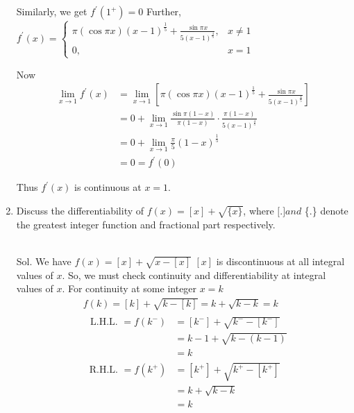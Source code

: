 \begin{enumerate}
\begin{outline}
Similarly, we get $f^{\prime}\left(1^{+}\right)=0$
Further, $f^{\prime}(x)= \begin{cases}\pi(\cos \pi x)(x-1)^{\frac{1}{5}}+\frac{\sin \pi x}{5(x-1)^{\frac{4}{5}}}, & x \neq 1 \\ 0, & x=1\end{cases}$

Now
$$
\begin{aligned}
\lim _{x \rightarrow 1} f^{\prime}(x) & =\lim _{x \rightarrow 1}\left[\pi(\cos \pi x)(x-1)^{\frac{1}{5}}+\frac{\sin \pi x}{5(x-1)^{\frac{4}{5}}}\right] \\
& =0+\lim _{x \rightarrow 1} \frac{\sin \pi(1-x)}{\pi(1-x)} \cdot \frac{\pi(1-x)}{5(x-1)^{\frac{4}{5}}} \\
& =0+\lim _{x \rightarrow 1} \frac{\pi}{5}(1-x)^{\frac{1}{5}} \\
& =0=f^{\prime}(0)
\end{aligned}
$$

Thus $f^{\prime}(x)$ is continuous at $x=1$.
\end{outline}

\item Discuss the differentiability of $f(x)=[x]+\sqrt{\{x\}}$, where $[$.$] and$ \{.\} denote the greatest integer function and fractional part respectively.\\\\

\begin{outline}
    Sol. We have $f(x)=[x]+\sqrt{x-[x]}$
$[x]$ is discontinuous at all integral values of $x$.
So, we must check continuity and differentiability at integral values of $x$.
For continuity at some integer $x=k$
$$
\begin{aligned}
& f(k)=[k]+\sqrt{k-[k]}=k+\sqrt{k-k}=k \\
& \begin{aligned}
\text { L.H.L. }=f\left(k^{-}\right) & =\left[k^{-}\right]+\sqrt{k^{-}-\left[k^{-}\right]} \\
& =k-1+\sqrt{k-(k-1)} \\
& =k
\end{aligned}
\end{aligned}
$$
$$
\begin{aligned}
\text { R.H.L. }=f\left(k^{+}\right) & =\left[k^{+}\right]+\sqrt{k^{+}-\left[k^{+}\right]} \\
& =k+\sqrt{k-k} \\
& =k
\end{aligned}
$$


\end{outline}
\end{enumerate}
